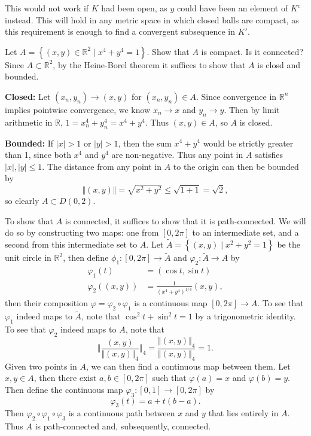 \documentclass[10pt]{amsart}
\theoremstyle{plain}
\newenvironment{exercise}[1]{%
  \renewcommand\themanualtheoreminner{#1}%
  \manualtheoreminner
}{\endmanualtheoreminner}
\theoremstyle{definition}
\begin{document}
This would not work if $K$ had been open, as $y$ could have been an element of $K^c$ instead. This will hold in any metric space in which closed balls are compact, as this requirement is enough to find a convergent subsequence in $K'$.

\begin{exercise}{3.29}
	Let $A = \left\{ (x,y) \in \mathbb{R}^2 \;|\; x^4 + y^4 = 1 \right\}$. Show that $A$ is compact. Is it connected?
	\hrulefill
\end{exercise}
Since $A \subset \mathbb{R}^2$, by the Heine-Borel theorem it suffices to show that $A$ is closd and bounded.

\textbf{Closed:} Let $(x_n,y_n) \to (x,y)$ for $(x_n,y_n) \in A$. Since convergence in $\mathbb{R}^n$ implies pointwise convergence, we know $x_n \to x$ and $y_n \to y$. Then by limit arithmetic in $\mathbb{R}$, $1 = x_n^4 + y_n^4 = x^4 + y^4$. Thus $(x,y) \in A$, so $A$ is closed.

\textbf{Bounded:} If $|x| > 1$ or $|y| > 1$, then the sum $x^4 + y^4$ would be strictly greater than 1, since both $x^4$ and $y^4$ are non-negative. Thus any point in $A$ satisfies $|x|,|y| \leq 1$. The distance from any point in $A$ to the origin can then be bounded by
\[
	\Vert{(x,y)}\Vert = \sqrt{x^2+y^2} \leq \sqrt{1 + 1} = \sqrt{2},
\] 
so clearly $A \subset D(0, 2)$.

To show that $A$ is connected, it suffices to show that it is path-connected. We will do so by constructing two maps: one from $[0,2\pi]$ to an intermediate set, and a second from this intermediate set to $A$. Let $\tilde{A}= \left\{ (x,y) \;|\; x^2 + y^2 = 1 \right\}$ be the unit circle in $\mathbb{R}^2$, then define $\phi_1 :[0,2\pi] \to \tilde{A}$ and $\varphi_2:\tilde{A}\to A$ by
\begin{align*}
	\varphi_1(t) &= (\cos t, \sin t) \\
	\varphi_2( (x,y)) &= \frac{1}{\left( x^4+y^4 \right)^{1/4}} (x,y),
\end{align*}
then their composition $\varphi = \varphi_2 \circ \varphi_1$ is a continuous map $[0,2\pi] \to A$. To see that $\varphi_1$ indeed maps to $\tilde{A}$, note that $\cos^2 t + \sin^2 t = 1$ by a trigonometric identity. To see that $\varphi_2$ indeed maps to $A$, note that
\[
	\Big\Vert{\frac{(x,y)}{\Vert{(x,y)}\Vert_4} }\Big\Vert_4 = \frac{\Vert{(x,y)}\Vert_4}{\Vert{(x,y)}\Vert_4} = 1.
\] 
Given two points in $A$, we can then find a continuous map between them. Let $x,y \in A$, then there exist $a,b \in [0,2\pi]$ such that $\varphi(a)=x$ and $\varphi(b)=y$. Then define the continuous map $\varphi_3:[0,1]\to[0,2\pi]$ by
\[
	\varphi_3(t) = a + t(b-a).
\] 
Then $\varphi_2 \circ \varphi_1 \circ \varphi_3$ is a continuous path between $x$ and $y$ that lies entirely in $A$. Thus $A$ is path-connected and, subsequently, connected.
\end{document}
